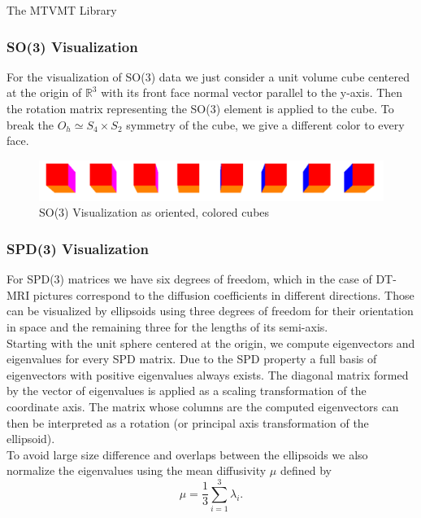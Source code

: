 \begin{chapter}{The MTVMT Library}
\subsubsection{SO(3) Visualization} %
\label{ssub:SO(3) Visualization}
For the visualization of SO(3) data we just consider a unit volume cube centered at the origin of $\mathbb{R}^3$ with its front face normal vector parallel to the y-axis.
Then the rotation matrix representing the SO(3) element is applied to the cube. To break the $O_h \simeq S_4\times S_2$ symmetry of the cube, we give a different color to
every face.

\begin{figure}[h!]
        \centering
	    \includegraphics[width=0.8\linewidth]{./figures/library/cubes.pdf}
	    \caption[SO(3) cube visualization]{SO(3) Visualization as oriented, colored cubes}
	\label{fig:cube_visualization}
\end{figure}

\subsubsection{SPD(3) Visualization} %
\label{ssub:SPD(3) Visualization}
For SPD(3) matrices we have six degrees of freedom, which in the case of DT-MRI pictures correspond to the diffusion coefficients in different directions.
Those can be visualized by ellipsoids using three degrees of freedom for their orientation in space and the remaining three for the lengths of its semi-axis.\\
Starting with the unit sphere centered at the origin, we compute eigenvectors and eigenvalues for every SPD matrix. Due to the SPD property a full basis of eigenvectors
with positive eigenvalues always exists. The diagonal matrix formed by the vector of eigenvalues is applied as a scaling transformation of the coordinate axis. The matrix
whose columns are the computed eigenvectors can then be interpreted as a rotation (or principal axis transformation of the ellipsoid).\\
To avoid large size difference and overlaps between the ellipsoids we also normalize the eigenvalues using the mean diffusivity $\mu$ defined by
\begin{equation}
    \mu = \frac{1}{3} \sum_{i=1}^{3}\lambda_i.
\end{equation}


\end{chapter}
